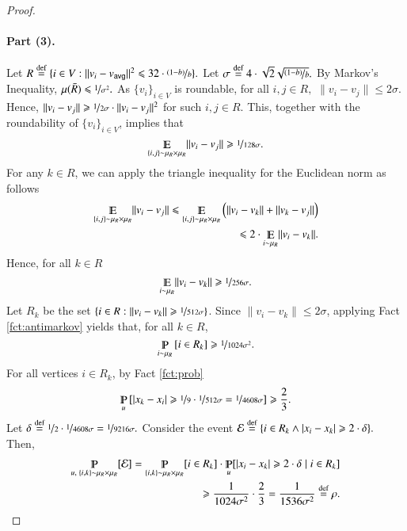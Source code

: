 \documentclass[twoside,leqno,twocolumn]{article}
\newcommand{\nfrac}{\nicefrac}
\renewcommand{\mathbb}{\varmathbb}
\renewcommand{\leq}{\leqslant}
\renewcommand{\geq}{\geqslant}
\newcommand{\cE}{\mathcal E}
\newcommand{\abs}[1]{\lvert#1\rvert}
\newcommand{\norm}[1]{\lVert#1\rVert}
\newcommand{\defeq}{\stackrel{\textup{def}}{=}}
\newcommand{\Esymb}{\mathbb{E}}
\newcommand{\Psymb}{\mathbb{P}}
\DeclareMathOperator*{\E}{\Esymb}
\DeclareMathOperator*{\ProbOp}{\Psymb}
\renewcommand{\Pr}{\ProbOp}
\numberwithin{equation}{section}
\newcommand{\avg}{{\ensuremath{\mathsf{avg}}\xspace}}
\begin{document}
\begin{proof}
\paragraph{Part (3).}
Let $R \defeq \{i \in V : \norm{v_i -v_\avg}^2 \leq 32 \cdot \nfrac{(1-b)}{b}\}.$ 
Let $\sigma \defeq 4 \cdot \sqrt{2} \sqrt{\nfrac{(1-b)}{b}}.$
By Markov's Inequality, $\mu(\bar{R}) \leq \nfrac{1}{\sigma^2}.$
As $\{v_i\}_{i \in V}$ is roundable, for all $i,j \in R,$ $ \norm{v_i - v_j} \leq 2 \sigma.$ Hence,   $\norm{v_i - v_j} \geq \nfrac{1}{2 \sigma} \cdot  \norm{v_i - v_j}^2$ for such $i,j \in R.$ 
This, together with the roundability of $\{v_i\}_{i \in V}$, implies that
$$ \E_{\{i,j\} \sim \mu_R \times \mu_R} \norm{v_i - v_j}   \geq  \nfrac{1}{128\sigma} .$$
For any $k \in R$, we can apply the triangle inequality for the Euclidean norm as follows
\begin{align*}
 \E_{\{i,j\} \sim \mu_R \times \mu_R}   \norm{v_i - v_j}    \leq  \E_{\{i,j\} \sim \mu_R \times \mu_R}    \left(\norm{v_i - v_k} + \norm{v_k - v_j}\right) \\
\leq 2 \cdot  \E_{i \sim \mu_R}   \norm{v_i - v_k}.
\end{align*}
Hence, for all $k \in R$
$$\E_{i \sim \mu_R}     \norm{v_i - v_k} \geq  \nfrac{1}{256\sigma}.$$
Let $R_k$ be the set $\left\{i \in R : \norm{v_i - v_k} \geq \nfrac{1}{512\sigma}  \right\}$. 
Since $\norm{v_i - v_k} \leq 2\sigma$, applying Fact \ref{fct:antimarkov} yields that, for all $k \in R$, 
$$\Pr_{i \sim \mu_R }\left[i \in R_k\right] \geq \nfrac{1}{1024\sigma^2}. $$
For all vertices $i \in R_k$, by Fact \ref{fct:prob}
$$\Pr_u\left[\abs{x_k - x_i}\geq \nfrac{1}{9} \cdot  \nfrac{1}{512\sigma} = \nfrac{1}{4608\sigma} \right]  \geq \frac{2}{3}.$$
Let $\delta \defeq \nfrac{1}{2}\cdot \nfrac{1}{4608\sigma}  = \nfrac{1}{9216\sigma}.$ Consider the event $\cE \defeq \{  i \in R_k \wedge \abs{x_i - x_k} \geq 2 \cdot \delta \}.$
Then,
\begin{align*}
\Pr_{u, \;\{i,k\} \sim \mu_R \times \mu_R} [\cE] =  \Pr_{\{i,k\} \sim \mu_R \times \mu_R}[i \in R_k ] \cdot \Pr_u[\abs{x_i - x_k} \geq 2 \cdot \delta \;|\; i \in R_k] 
\\
\geq \frac{1}{1024\sigma^2} \cdot \frac{2}{3} = \frac{1}{1536\sigma^2} \defeq \rho.
\end{align*}


\end{proof}
\end{document}
